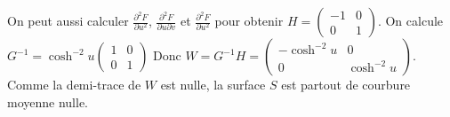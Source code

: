 {{On peut aussi calculer
$\frac{\partial^2 F}{\partial u^2}$,
$\frac{\partial^2 F}{\partial u\partial v}$ et 
$\frac{\partial^2 F}{\partial u^2}$ pour obtenir $H=\begin{pmatrix}-1&0\\0&1\end{pmatrix}$.
On calcule $G^{-1}=\cosh^{-2} u\begin{pmatrix} 1&0\\0&1\end{pmatrix}$
Donc $W=G^{-1}H=\begin{pmatrix}-\cosh^{-2} u&0\\0&\cosh^{-2} u\end{pmatrix}$.
Comme la demi-trace de $W$ est nulle, la surface $S$ est partout de courbure moyenne nulle.
}
}
